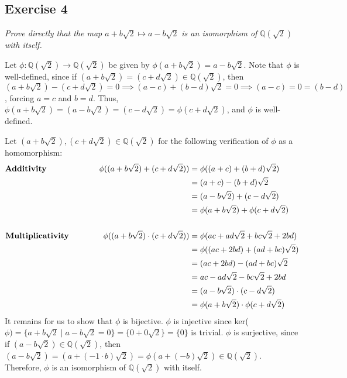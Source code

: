 \subsection*{Exercise 4}
\begin{framed}
\textit{Prove directly that the map $a + b\sqrt{2} \mapsto a - b\sqrt{2}$ is an isomorphism of $\mathbb{Q}(\sqrt{2})$ with itself.}
\end{framed}

Let $\phi: \mathbb{Q}(\sqrt{2}) \rightarrow \mathbb{Q}(\sqrt{2})$ be given by $\phi(a + b\sqrt{2}) = a - b\sqrt{2}$. Note that $\phi$ is well-defined, since if $(a + b\sqrt{2}) = (c + d\sqrt{2}) \in \mathbb{Q}(\sqrt{2})$, then $(a + b\sqrt{2}) - (c + d\sqrt{2}) = 0 \implies (a - c) + (b - d)\sqrt{2} = 0 \implies (a - c) = 0 = (b - d)$, forcing $a = c$ and $b = d$. Thus, $\phi(a + b\sqrt{2}) = (a - b\sqrt{2}) = (c - d\sqrt{2}) = \phi(c + d\sqrt{2})$, and $\phi$ is well-defined.

Let $(a + b\sqrt{2}), (c + d\sqrt{2}) \in \mathbb{Q}(\sqrt{2})$ for the following verification of $\phi$ as a homomorphism:
\begin{align*}
    \textbf{Additivity} \hspace{23 mm} \phi((a + b\sqrt{2}) + (c + d\sqrt{2})) &= \phi((a + c) + (b + d)\sqrt{2}) \\
    &= (a + c) - (b + d)\sqrt{2} \\
    &= (a - b\sqrt{2}) + (c - d\sqrt{2}) \\
    &= \phi(a + b\sqrt{2}) + \phi(c + d\sqrt{2}) \\
    \\
    \textbf{Multiplicativity} \hspace{15 mm} \phi((a + b\sqrt{2})\cdot(c + d\sqrt{2})) &= \phi(ac + ad\sqrt{2} + bc\sqrt{2} + 2bd) \\
    &= \phi((ac + 2bd) + (ad + bc)\sqrt{2}) \\
    &= (ac + 2bd) - (ad + bc)\sqrt{2} \\
    &= ac - ad\sqrt{2} - bc\sqrt{2} + 2bd \\
    &= (a - b\sqrt{2})\cdot(c - d\sqrt{2}) \\
    &= \phi(a + b\sqrt{2})\cdot\phi(c + d\sqrt{2})
\end{align*}
It remains for us to show that $\phi$ is bijective. $\phi$ is injective since ker($\phi) = \{a + b\sqrt{2} \mid a - b\sqrt{2} = 0\} = \{0 + 0\sqrt{2}\} = \{0\}$ is trivial. $\phi$ is surjective, since if $(a - b\sqrt{2}) \in \mathbb{Q}(\sqrt{2})$, then $(a - b\sqrt{2}) = (a + (-1 \cdot b)\sqrt{2}) = \phi(a + (-b)\sqrt{2}) \in \mathbb{Q}(\sqrt{2})$. Therefore, $\phi$ is an isomorphism of $\mathbb{Q}(\sqrt{2})$ with itself.